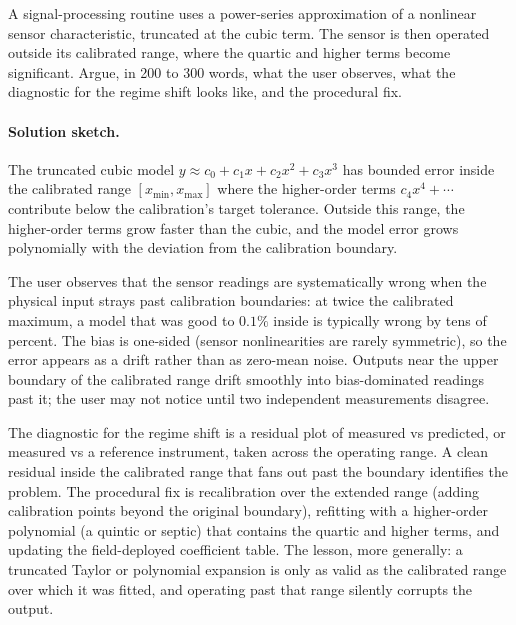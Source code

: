 \begin{exercise}
A signal-processing routine uses a power-series approximation of a
nonlinear sensor characteristic, truncated at the cubic term. The
sensor is then operated outside its calibrated range, where the
quartic and higher terms become significant. Argue, in 200 to 300
words, what the user observes, what the diagnostic for the regime
shift looks like, and the procedural fix.

\paragraph{Solution sketch.} The truncated cubic model $y \approx
c_{0} + c_{1} x + c_{2} x^{2} + c_{3} x^{3}$ has bounded error inside
the calibrated range $[x_{\min}, x_{\max}]$ where the higher-order
terms $c_{4} x^{4} + \cdots$ contribute below the calibration's
target tolerance. Outside this range, the higher-order terms grow
faster than the cubic, and the model error grows polynomially with
the deviation from the calibration boundary.

The user observes that the sensor readings are systematically wrong
when the physical input strays past calibration boundaries: at twice
the calibrated maximum, a model that was good to $0.1\%$ inside is
typically wrong by tens of percent. The bias is one-sided (sensor
nonlinearities are rarely symmetric), so the error appears as a
drift rather than as zero-mean noise. Outputs near the upper boundary
of the calibrated range drift smoothly into bias-dominated readings
past it; the user may not notice until two independent measurements
disagree.

The diagnostic for the regime shift is a residual plot of measured
vs predicted, or measured vs a reference instrument, taken across
the operating range. A clean residual inside the calibrated range
that fans out past the boundary identifies the problem. The
procedural fix is recalibration over the extended range (adding
calibration points beyond the original boundary), refitting with a
higher-order polynomial (a quintic or septic) that contains the
quartic and higher terms, and updating the field-deployed coefficient
table. The lesson, more generally: a truncated Taylor or polynomial
expansion is only as valid as the calibrated range over which it
was fitted, and operating past that range silently corrupts the
output.
\end{exercise}

